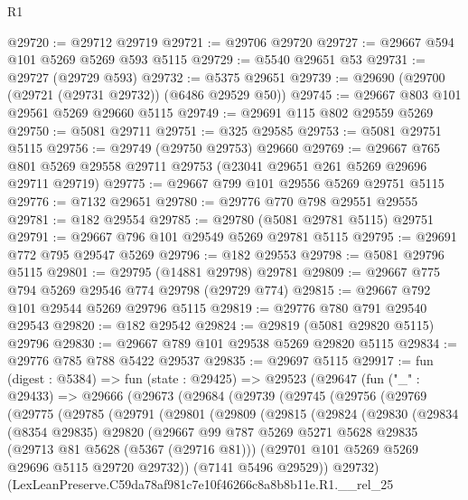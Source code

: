 \begin{lexlean}{R1}
\begin{coremodule}
@29720 := @29712 @29719
@29721 := @29706 @29720
@29727 := @29667 @594 @101 @5269 @5269 @593 @5115
@29729 := @5540 @29651 @53
@29731 := @29727 (@29729 @593)
@29732 := @5375 @29651
@29739 := @29690 (@29700 (@29721 (@29731 @29732)) (@6486 @29529 @50))
@29745 := @29667 @803 @101 @29561 @5269 @29660 @5115
@29749 := @29691 @115 @802 @29559 @5269
@29750 := @5081 @29711
@29751 := @325 @29585
@29753 := @5081 @29751 @5115
@29756 := @29749 (@29750 @29753) @29660
@29769 := @29667
    @765
    @801
    @5269
    @29558
    @29711
    @29753
    (@23041 @29651 @261 @5269 @29696 @29711 @29719)
@29775 := @29667 @799 @101 @29556 @5269 @29751 @5115
@29776 := @7132 @29651
@29780 := @29776 @770 @798 @29551 @29555
@29781 := @182 @29554
@29785 := @29780 (@5081 @29781 @5115) @29751
@29791 := @29667 @796 @101 @29549 @5269 @29781 @5115
@29795 := @29691 @772 @795 @29547 @5269
@29796 := @182 @29553
@29798 := @5081 @29796 @5115
@29801 := @29795 (@14881 @29798) @29781
@29809 := @29667 @775 @794 @5269 @29546 @774 @29798 (@29729 @774)
@29815 := @29667 @792 @101 @29544 @5269 @29796 @5115
@29819 := @29776 @780 @791 @29540 @29543
@29820 := @182 @29542
@29824 := @29819 (@5081 @29820 @5115) @29796
@29830 := @29667 @789 @101 @29538 @5269 @29820 @5115
@29834 := @29776 @785 @788 @5422 @29537
@29835 := @29697 @5115
@29917 := fun (digest : @5384) =>
  fun (state : @29425) =>
  @29523
    (@29647
      (fun ("_" : @29433) =>
      @29666
        (@29673
          (@29684
            (@29739
              (@29745
                (@29756
                  (@29769
                    (@29775
                      (@29785
                        (@29791
                          (@29801
                            (@29809
                              (@29815
                                (@29824
                                  (@29830
                                    (@29834
                                      (@8354 @29835)
                                      @29820
                                      (@29667
                                        @99
                                        @787
                                        @5269
                                        @5271
                                        @5628
                                        @29835
                                        (@29713 @81 @5628 (@5367 (@29716 @81)))
                                        (@29701 @101 @5269 @5269 @29696 @5115 @29720 @29732))
                                      (@7141 @5496 @29529))
                                    @29732)
                                  (LexLeanPreserve.C59da78af981c7e10f46266c8a8b8b11e.R1.__rel_25

\end{coremodule}
\end{lexlean}
